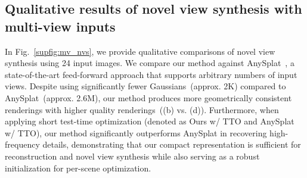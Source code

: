 \subsection{Qualitative results of novel view synthesis with multi-view inputs}

In Fig.~\ref{supfig:mv_nvs}, we provide qualitative comparisons of novel view synthesis using 24 input images. We compare our method against AnySplat~\cite{jiang2025anysplat}, a state-of-the-art feed-forward approach that supports arbitrary numbers of input views. Despite using significantly fewer Gaussians~(approx. 2K) compared to AnySplat~(approx. 2.6M), our method produces more geometrically consistent renderings with higher quality renderings~((b) vs. (d)). Furthermore, when applying short test-time optimization (denoted as Ours w/ TTO and AnySplat w/ TTO), our method significantly outperforms AnySplat in recovering high-frequency details, demonstrating that our compact representation is sufficient for reconstruction and novel view synthesis while also serving as a robust initialization for per-scene optimization.
\clearpage
